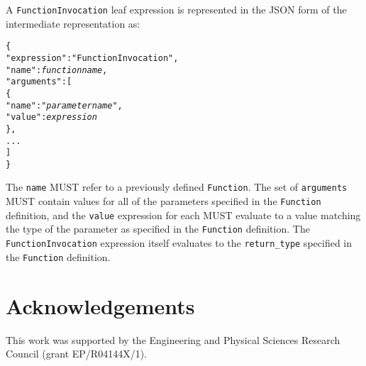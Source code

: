 \documentclass[10pt,twocolumn,a4paper]{article}
\newcommand{\code}[1]{\texttt{#1}}
\begin{document}
A \code{FunctionInvocation} leaf expression is represented in the JSON form of the
intermediate representation as:
\footnotesize
\begin{alltt}
  \{
    "expression"   : "FunctionInvocation",
    "name"         : \emph{function name},
    "arguments"    : [
      \{
        "name"  : "\emph{parameter name}",
        "value" : \emph{expression}
      \},
      ...
    ]
  \}
\end{alltt}
\normalsize
The \code{name} MUST refer to a previously defined \code{Function}. The set
of \code{arguments} MUST contain values for all of the parameters specified
in the \code{Function} definition, and the \code{value} expression for each
MUST evaluate to a value matching the type of the parameter as specified in
the \code{Function} definition. The \code{FunctionInvocation} expression
itself evaluates to the \code{return\_type} specified in the
\code{Function} definition.

\section{Acknowledgements}

This work was supported by the Engineering and Physical Sciences Research
Council (grant EP/R04144X/1).



\ifpdf
  \ifdefined\pdftrailerid
    \pdftrailerid{}
  \fi
\fi
\end{document}
